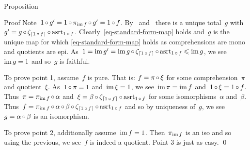 \documentclass[b]{subfiles}
\begin{document}
\begin{parsec}
\begin{point}{Proposition}
\begin{point}{Proof}
Note~$1 \mathop{\circ} g' = 1 \mathop{\circ} \pi_{\operatorname{im} f} \mathop{\circ} g' = 1 \mathop{\circ} f$.
By~ and~
    there is a unique total~$g$ with~$g' = g \mathop{\circ} \zeta_{\left\lceil1 \mathop{\circ} f\right\rceil} \mathop{\circ} \mathrm{asrt}_{1 \mathop{\circ} f}$.
Clearly~\eqref{eq-standard-form-map} holds
and~$g$ is the unique map
    for which \eqref{eq-standard-form-map} holds
    as  comprehensions are mono and quotients are epi.
    As~$1 = \operatorname{im} g' = \operatorname{im} g \mathop{\circ} \zeta_{\left\lceil1 \mathop{\circ} f\right\rceil}
            \mathop{\circ} \mathrm{asrt}_{1 \mathop{\circ} f} \leqslant \operatorname{im} g$,
            we see~$\operatorname{im} g = 1$ and so~$g$ is faithful.

To prove point 1, assume~$f$ is pure.
That is: $f = \pi \mathop{\circ} \xi$ for some comprehension~$\pi$
        and quotient~$\xi$.
As~$1 \mathop{\circ} \pi=1$ and~$\operatorname{im} \xi = 1$,
    we see~$\operatorname{im} \pi = \operatorname{im} f$ and~$1 \mathop{\circ} \xi = 1\mathop{\circ} f$.
Thus~$\pi = \pi_{\operatorname{im} f} \mathop{\circ} \alpha$
    and~$\xi = \beta \mathop{\circ} \zeta_{\left\lceil1 \mathop{\circ} f\right\rceil}
                \mathop{\circ} \mathrm{asrt}_{1 \mathop{\circ} f}$
        for some isomorphisms~$\alpha$ and~$\beta$.
Thus~$f = \pi_{\operatorname{im} f} \mathop{\circ} \alpha \mathop{\circ} \beta
                \mathop{\circ} \zeta_{\left\lceil1 \mathop{\circ} f\right\rceil}
                \mathop{\circ} \mathrm{asrt}_{1 \mathop{\circ} f}$
        and so by uniqueness of~$g$,
        we see~$g = \alpha \mathop{\circ} \beta$ is an isomorphism.

To prove point 2, additionally assume~$\operatorname{im} f= 1$.
Then~$\pi_{\operatorname{im} f}$ is an iso and so
using the previous, we see~$f$ is indeed a quotient.
Point 3 is just as easy. \qed
\end{point}
\end{point}
\end{parsec}
\end{document}
